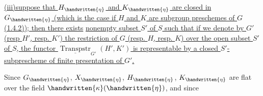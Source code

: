 \uline{(iii)suppose that $H_{\handwritten{\eta}}$ and $K_{\handwritten{\eta}}$ are closed in $G_{\handwritten{\eta}}$ (which is the case if $H$ and $K$ are subgroup preschemes of $G$ (1.4.2)); then there exists}  \uline{nonempty subset $S'$ of $S$ such that if we denote by $G'$ (resp $H'$, resp. $K'$) the restriction of $G$ (resp. $H$, resp. $K$) over the open subset $S'$ of $S$, the functor $\underline{\operatorname{Transpstr}}_{G'}(H',K')$ is representable by a closed $S'$-subprescheme of finite presentation of $G'$.}

Since $G_{\handwritten{\eta}}$, $X_{\handwritten{\eta}}$, $H_{\handwritten{\eta}}$, $K_{\handwritten{\eta}}$ are flat over the field $\handwritten{\kappa}(\handwritten{\eta})$, and since
